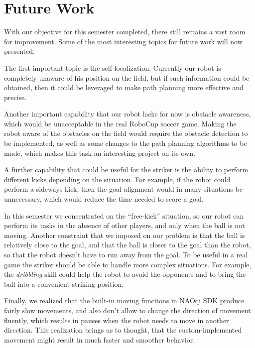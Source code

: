 \section{Future Work}

With our objective for this semester completed, there still remains a vast room
for improvement. Some of the most interesting topics for future work will now
presented.

The first important topic is the self-localization. Currently our robot is
completely unaware of his position on the field, but if such information could
be obtained, then it could be leveraged to make path planning more effective
and precise.

Another important capability that our robot lacks for now is obstacle
awareness, which would be unacceptable in the real RoboCup soccer game. Making
the robot aware of the obstacles on the field would require the obstacle
detection to be implemented, as well as some changes to the path planning
algorithms to be made, which makes this task an interesting project on its own.

A further capability that could be useful for the striker is the ability to
perform different kicks depending on the situation. For example, if the robot
could perform a sideways kick, then the goal alignment would in many situations
be unnecessary, which would reduce the time needed to score a goal.

In this semester we concentrated on the ``free-kick'' situation, so our robot
can perform its tasks in the absence of other players, and only when the ball
is not moving. Another constraint that we imposed on our problem is that the
ball is relatively close to the goal, and that the ball is closer to the goal
than the robot, so that the robot doesn't have to run away from the goal. To be
useful in a real game the striker should be able to handle more complex
situations. For example, the \textit{dribbling} skill could help the robot to
avoid the opponents and to bring the ball into a convenient striking position.

Finally, we realized that the built-in moving functions in NAOqi SDK produce
fairly slow movements, and also don't allow to change the direction of movement
fluently, which results in pauses when the robot needs to move in another
direction. This realization brings us to thought, that the custom-implemented
movement might result in much faster and smoother behavior.
